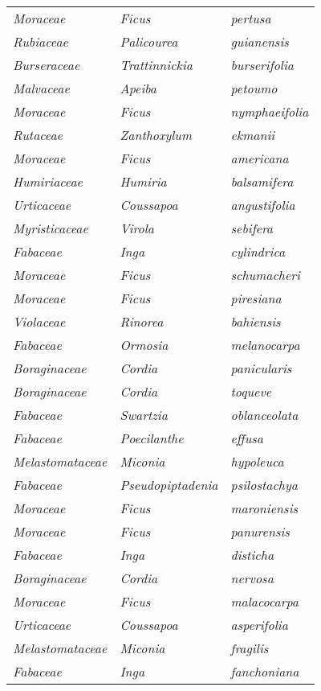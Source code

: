 \documentclass[fleqn,10pt]{ArtEcoFoG} %
\renewenvironment{table}{\begin{table*}}{\end{table*}\ignorespacesafterend}
\begin{document}
\begin{table}
\begin{tabular}[t]{lll}
\em{Moraceae} & \em{Ficus} & \em{pertusa}\\
\em{Rubiaceae} & \em{Palicourea} & \em{guianensis}\\
\em{Burseraceae} & \em{Trattinnickia} & \em{burserifolia}\\
\em{Malvaceae} & \em{Apeiba} & \em{petoumo}\\
\em{Moraceae} & \em{Ficus} & \em{nymphaeifolia}\\
\addlinespace
\em{Rutaceae} & \em{Zanthoxylum} & \em{ekmanii}\\
\em{Moraceae} & \em{Ficus} & \em{americana}\\
\em{Humiriaceae} & \em{Humiria} & \em{balsamifera}\\
\em{Urticaceae} & \em{Coussapoa} & \em{angustifolia}\\
\em{Myristicaceae} & \em{Virola} & \em{sebifera}\\
\addlinespace
\em{Fabaceae} & \em{Inga} & \em{cylindrica}\\
\em{Moraceae} & \em{Ficus} & \em{schumacheri}\\
\em{Moraceae} & \em{Ficus} & \em{piresiana}\\
\em{Violaceae} & \em{Rinorea} & \em{bahiensis}\\
\em{Fabaceae} & \em{Ormosia} & \em{melanocarpa}\\
\addlinespace
\em{Boraginaceae} & \em{Cordia} & \em{panicularis}\\
\em{Boraginaceae} & \em{Cordia} & \em{toqueve}\\
\em{Fabaceae} & \em{Swartzia} & \em{oblanceolata}\\
\em{Fabaceae} & \em{Poecilanthe} & \em{effusa}\\
\em{Melastomataceae} & \em{Miconia} & \em{hypoleuca}\\
\addlinespace
\em{Fabaceae} & \em{Pseudopiptadenia} & \em{psilostachya}\\
\em{Moraceae} & \em{Ficus} & \em{maroniensis}\\
\em{Moraceae} & \em{Ficus} & \em{panurensis}\\
\em{Fabaceae} & \em{Inga} & \em{disticha}\\
\em{Boraginaceae} & \em{Cordia} & \em{nervosa}\\
\addlinespace
\em{Moraceae} & \em{Ficus} & \em{malacocarpa}\\
\em{Urticaceae} & \em{Coussapoa} & \em{asperifolia}\\
\em{Melastomataceae} & \em{Miconia} & \em{fragilis}\\
\em{Fabaceae} & \em{Inga} & \em{fanchoniana}\\

\end{tabular}
\end{table}
\end{document}
